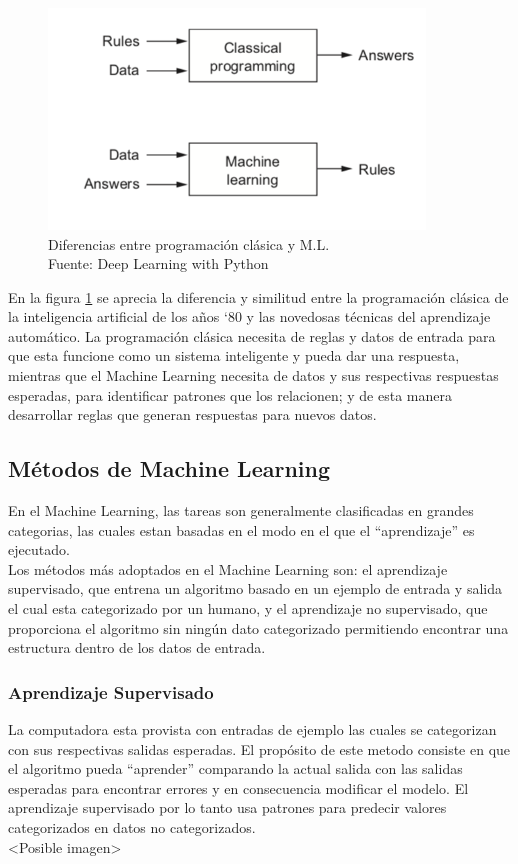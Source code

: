 \begin{figure}[H]
    \begin{center}
        \includegraphics[width=10cm]{img/capitulo_2/machinelearning.png}
    \end{center}
    \caption{Diferencias entre programación clásica y M.L.\\Fuente: Deep Learning with Python}
    \label{fig:classical_ml}
\end{figure}

En la figura \ref{fig:classical_ml} se aprecia la diferencia y similitud entre la programación clásica de la inteligencia artificial de los años `80 y las novedosas técnicas del aprendizaje automático. La programación clásica necesita de reglas y datos de entrada para que esta funcione como un sistema inteligente y pueda dar una respuesta, mientras que el Machine Learning necesita de datos y sus respectivas respuestas esperadas, para identificar patrones que los relacionen; y de esta manera  desarrollar reglas que generan respuestas para nuevos datos.

\subsection{Métodos de Machine Learning}
En el Machine Learning, las tareas son generalmente clasificadas en grandes categorias, las cuales estan basadas en el modo en el que el ``aprendizaje'' es ejecutado.\\

Los métodos más adoptados en el Machine Learning son: el aprendizaje supervisado, que entrena un algoritmo basado en un ejemplo de entrada y salida el cual esta categorizado por un humano, y el aprendizaje no supervisado, que proporciona el algoritmo sin ningún dato categorizado permitiendo encontrar una estructura dentro de los datos de entrada.\

\subsubsection{Aprendizaje Supervisado}
La computadora esta provista con entradas de ejemplo las cuales se categorizan con sus respectivas salidas esperadas. El propósito de este metodo consiste en que el algoritmo pueda  ``aprender'' comparando la actual salida con las salidas esperadas para encontrar errores y en consecuencia modificar el modelo. El aprendizaje supervisado por lo tanto usa patrones para predecir valores categorizados en datos no categorizados.\\
<Posible imagen>

